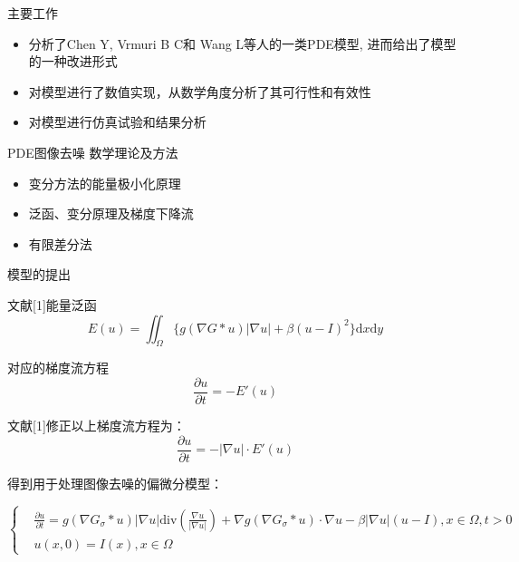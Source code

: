 \documentclass{beamer}
\begin{document}
\begin{frame}{{\fangsong 主要工作}}
\begin{itemize}
\item {\kaishu 分析了Chen Y, Vrmuri B C和 Wang L等人的一类PDE模型, 进而给出了模型的一种改进形式}
\item {\kaishu 对模型进行了数值实现，从数学角度分析了其可行性和有效性}
\item {\kaishu 对模型进行仿真试验和结果分析}
\end{itemize}
\end{frame}
\begin{frame}{{\fangsong PDE图像去噪 数学理论及方法}}
\begin{itemize}
\item {\kaishu 变分方法的能量极小化原理}
\item {\kaishu 泛函、变分原理及梯度下降流}
\item {\kaishu 有限差分法}
\end{itemize}
\end{frame}
\begin{frame}{{\fangsong 模型的提出}}
\begin{footnotesize}
{\kaishu 文献[1]能量泛函}
$$E(u)=\iint_{\varOmega}\{g(\nabla G*u)|\nabla u|+\beta(u-I)^{2}\}\mathrm{d}x\mathrm{d}y$$

{\kaishu 对应的梯度流方程}
$$\frac{\partial u}{\partial t}=-E'(u)$$

{\kaishu 文献[1]修正以上梯度流方程为：}
$$\frac{\partial u}{\partial t}=-|\nabla u|\cdot E'(u)$$

{\kaishu 得到用于处理图像去噪的偏微分模型：}
\begin{scriptsize}
\begin{equation}
\left\{
\begin{aligned}
&\frac{\partial u}{\partial t}=  g(\nabla G_{\sigma}*u)|\nabla u|\mathrm{div}\left(\frac{\nabla u}{|\nabla u|}\right)+\nabla g(\nabla G_{\sigma}*u)\cdot\nabla u-\beta|\nabla u|(u-I), x\in\varOmega,t>0\\
&u(x,0) =I(x),x\in\varOmega
\end{aligned}
\right.
\end{equation}
\end{scriptsize}
\end{footnotesize}
\end{frame}
\end{document}
